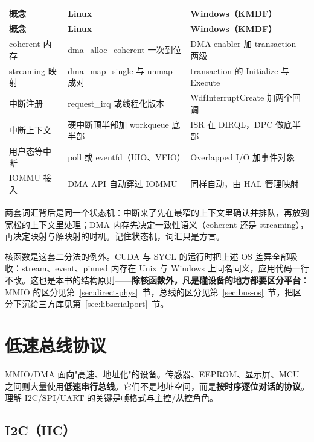 \documentclass[12pt,a4paper,fontset=fandol]{ctexbook}
\begin{document}
\begin{longtable}{>{\raggedright\arraybackslash}p{3.4cm}>{\raggedright\arraybackslash}p{5.5cm}>{\raggedright\arraybackslash}p{5.5cm}}
\toprule
\textbf{概念} & \textbf{Linux} & \textbf{Windows（KMDF）} \\
\midrule
\endfirsthead
\toprule
\textbf{概念} & \textbf{Linux} & \textbf{Windows（KMDF）} \\
\midrule
\endhead
coherent 内存 & dma\_alloc\_coherent 一次到位 & DMA enabler 加 transaction 两级 \\
streaming 映射 & dma\_map\_single 与 unmap 成对 & transaction 的 Initialize 与 Execute \\
中断注册 & request\_irq 或线程化版本 & WdfInterruptCreate 加两个回调 \\
中断上下文 & 硬中断顶半部加 workqueue 底半部 & ISR 在 DIRQL，DPC 做底半部 \\
用户态等中断 & poll 或 eventfd（UIO、VFIO） & Overlapped I/O 加事件对象 \\
IOMMU 接入 & DMA API 自动穿过 IOMMU & 同样自动，由 HAL 管理映射 \\
\bottomrule
\end{longtable}

两套词汇背后是同一个状态机：中断来了先在最窄的上下文里确认并排队，再放到宽松的上下文里处理；DMA 内存先决定一致性语义（coherent 还是 streaming），再决定映射与解映射的时机。记住状态机，词汇只是方言。

核函数是这套二分法的例外。CUDA 与 SYCL 的运行时把上述 OS 差异全部吸收：stream、event、pinned 内存在 Unix 与 Windows 上同名同义，应用代码一行不改。这也是本书的结构原则——\textbf{除核函数外，凡是碰设备的地方都要区分平台}：MMIO 的区分见第~\ref{sec:direct-phys}~节，总线的区分见第~\ref{sec:bus-os}~节，把区分下沉给三方库见第~\ref{sec:libserialport}~节。

\chapter{低速总线协议}\label{ch:slow-bus}

MMIO/DMA 面向"高速、地址化"的设备。传感器、EEPROM、显示屏、MCU 之间则大量使用\textbf{低速串行总线}。它们不是地址空间，而是\textbf{按时序逐位对话的协议}。理解 I2C/SPI/UART 的关键是帧格式与主控/从控角色。

\section{I2C（IIC）}\label{sec:i2c}
\end{document}
